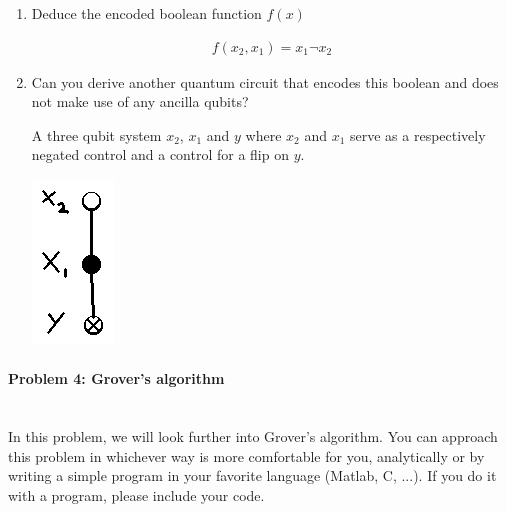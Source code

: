 \documentclass[12pt]{article}
\newenvironment{answer}{\begingroup\setlength{\leftskip}{-\leftmargin}\begin{framed}}{\end{framed}\endgroup}
\begin{document}
\begin{enumerate}
	\item Deduce the encoded boolean function $f(x)$

	\begin{answer}
		\begin{align*}f(x_2, x_1) = x_{1}\neg{}x_2\end{align*}
	\end{answer}

	\item Can you derive another quantum circuit that encodes this boolean and does not make use of any ancilla qubits?

	\begin{answer}
		A three qubit system $x_2$, $x_1$ and $y$ where $x_2$ and $x_1$ serve as a respectively negated control and a control for a flip on $y$.

		\begin{center}\includegraphics[height=.2\textwidth]{problem-3-5.png}\end{center}
	\end{answer}
\end{enumerate}

\paragraph{Problem 4: Grover's algorithm} \hfill \\

In this problem, we will look further into Grover's algorithm. You can approach this problem in whichever way is more comfortable for you, analytically or by writing a simple program in your favorite language (Matlab, C, ...). If you do it with a program, please include your code.
\end{document}
